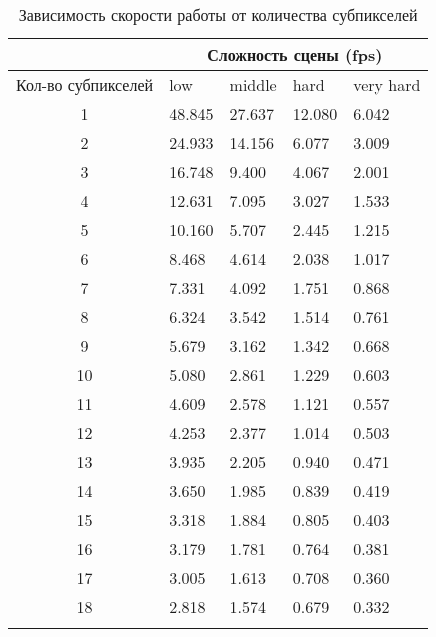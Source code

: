 \begin{center}
\begin{longtable}{|c|p{2cm}|p{2cm}|p{2cm}|p{2cm}|}
\hline & \multicolumn{4}{c|}{Сложность сцены (fps)} \\ 
\hline Кол-во субпикселей & low & middle & hard &  very hard\\ 
\hline 1 &  48.845 & 27.637 & 12.080 & 6.042 \\ 
\hline 2 &  24.933 & 14.156 & 6.077 & 3.009 \\ 
\hline 3 &  16.748 & 9.400 & 4.067 & 2.001 \\ 
\hline 4 &  12.631 & 7.095 & 3.027 & 1.533 \\ 
\hline 5 &  10.160 & 5.707 & 2.445 & 1.215 \\ 
\hline 6 &  8.468 & 4.614 & 2.038 & 1.017 \\ 
\hline 7 &  7.331 & 4.092 & 1.751 & 0.868 \\ 
\hline 8 &  6.324 & 3.542 & 1.514 & 0.761 \\ 
\hline 9 &  5.679 & 3.162 & 1.342 & 0.668 \\ 
\hline 10 &  5.080 & 2.861 & 1.229 & 0.603 \\ 
\hline 11 &  4.609 & 2.578 & 1.121 & 0.557 \\ 
\hline 12 &  4.253 & 2.377 & 1.014 & 0.503 \\ 
\hline 13 &  3.935 & 2.205 & 0.940 & 0.471 \\ 
\hline 14 &  3.650 & 1.985 & 0.839 & 0.419 \\ 
\hline 15 &  3.318 & 1.884 & 0.805 & 0.403 \\ 
\hline 16 &  3.179 & 1.781 & 0.764 & 0.381 \\ 
\hline 17 &  3.005 & 1.613 & 0.708 & 0.360 \\ 
\hline 18 &  2.818 & 1.574 & 0.679 & 0.332 \\ 
\hline
\caption{Зависимость скорости работы от количества субпикселей}\label{tab:performance_aa}\end{longtable}
\end{center}

